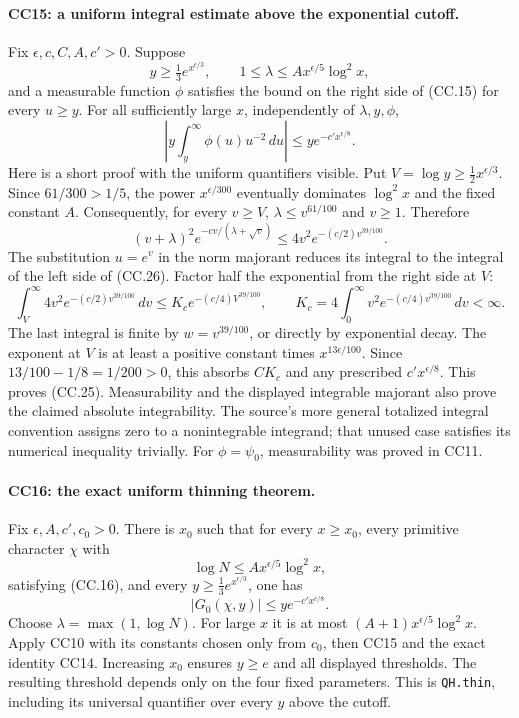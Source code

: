 \paragraph{CC15: a uniform integral estimate above the exponential cutoff.}
Fix $\epsilon,c,C,A,c'>0$. Suppose
\[
 y\ge\tfrac13e^{x^{\epsilon/3}},\qquad
 1\le\lambda\le Ax^{\epsilon/5}\log^2x,
\]
and a measurable function $\phi$ satisfies the bound on the
right side of (CC.15) for every $u\ge y$.
For all sufficiently large $x$, independently of $\lambda,y,\phi$,
\[
 \left|y\int_y^\infty\phi(u)u^{-2}\,du\right|
                          \le y e^{-c'x^{\epsilon/8}}.   \tag{CC.25}
\]
Here is a short proof with the uniform quantifiers visible.
Put $V=\log y\ge\tfrac12x^{\epsilon/3}$.
Since $61/300>1/5$, the power $x^{\epsilon/300}$ eventually
dominates $\log^2x$ and the fixed constant $A$.
Consequently, for every $v\ge V$,
$\lambda\le v^{61/100}$ and $v\ge1$. Therefore
\[
 (v+\lambda)^2e^{-cv/(\lambda+\sqrt v)}
                    \le4v^2e^{-(c/2)v^{39/100}}.        \tag{CC.26}
\]
The substitution $u=e^v$ in the norm majorant reduces its
integral to the integral of the left side of (CC.26).
Factor half the exponential from the right side at $V$:
\[
 \int_V^\infty4v^2e^{-(c/2)v^{39/100}}\,dv
 \le K_c e^{-(c/4)V^{39/100}},\qquad
 K_c=4\int_0^\infty v^2e^{-(c/4)v^{39/100}}\,dv<\infty.
\]
The last integral is finite by $w=v^{39/100}$, or directly
by exponential decay. The exponent at $V$ is at least a
positive constant times $x^{13\epsilon/100}$.
Since $13/100-1/8=1/200>0$, this absorbs $CK_c$ and any
prescribed $c'x^{\epsilon/8}$. This proves (CC.25).
Measurability and the displayed integrable majorant also prove
the claimed absolute integrability. The source's more general
totalized integral convention assigns zero to a nonintegrable
integrand; that unused case satisfies its numerical inequality
trivially. For $\phi=\psi_0$, measurability was proved in CC11.

\paragraph{CC16: the exact uniform thinning theorem.}
Fix $\epsilon,A,c',c_0>0$. There is $x_0$ such that for every
$x\ge x_0$, every primitive character $\chi$ with
\[
       \log N\le Ax^{\epsilon/5}\log^2x,
\]
satisfying (CC.16), and every
$y\ge\tfrac13e^{x^{\epsilon/3}}$, one has
\[
                        |G_0(\chi,y)|
                                \le y e^{-c'x^{\epsilon/8}}.
                                                               \tag{CC.27}
\]
Choose $\lambda=\max(1,\log N)$. For large $x$ it is at most
$(A+1)x^{\epsilon/5}\log^2x$. Apply CC10 with its constants
chosen only from $c_0$, then CC15 and the exact identity CC14.
Increasing $x_0$ ensures $y\ge e$ and all displayed thresholds.
The resulting threshold depends only on the four fixed
parameters. This is \texttt{QH.thin}, including its universal
quantifier over every $y$ above the cutoff.

